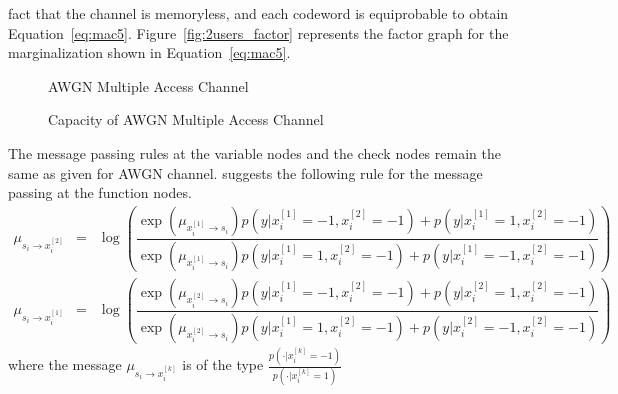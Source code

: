 fact that the channel is memoryless, and each codeword is equiprobable to obtain Equation~\ref{eq:mac5}. Figure~\ref{fig:2users_factor} represents the factor graph 
for the marginalization shown in Equation~\ref{eq:mac5}.
 \begin{figure}[scale=1, !tp]
 \centering
\caption{AWGN Multiple Access Channel}
\label{fig:awgn_channel}
\end{figure}

\begin{figure}[scale=1, !tp]
 \centering
\caption{Capacity of AWGN Multiple Access Channel}
\label{fig:awgn_channel_capacity}
\end{figure}


The message passing rules at the variable nodes and the check nodes remain the same as given for AWGN channel. \cite{2user} suggests the following rule
for the message passing at the function nodes. 
\begin{eqnarray}
 \mu_{s_i \rightarrow x_i^{[2]}} &=& \log \left( \dfrac{\exp( \mu_{x_i^{[1]} \rightarrow s_i}) p(y|x_i^{[1]} = -1, x_i^{[2]} = -1) + p(y|x_i^{[1]} = 1, x_i^{[2]} = -1)}{\exp( \mu_{x_i^{[1]} \rightarrow s_i}) p(y|x_i^{[1]} = 1, x_i^{[2]} = -1) + p(y|x_i^{[1]} = -1, x_i^{[2]} = -1)} \right) \\
 \mu_{s_i \rightarrow x_i^{[1]}} &=& \log \left( \dfrac{\exp( \mu_{x_i^{[2]} \rightarrow s_i}) p(y|x_i^{[1]} = -1, x_i^{[2]} = -1) + p(y|x_i^{[2]} = 1, x_i^{[2]} = -1)}{\exp( \mu_{x_i^{[2]} \rightarrow s_i}) p(y|x_i^{[1]} = 1, x_i^{[2]} = -1) + p(y|x_i^{[2]} = -1, x_i^{[2]} = -1)} \right)
\end{eqnarray}
where the message $\mu_{s_i \rightarrow x_i^{[k]}}$ is of the type $\frac{p(\cdotp|x_i^{[k]} = -1)}{p(\cdotp|x_i^{[k]} = 1)}$
